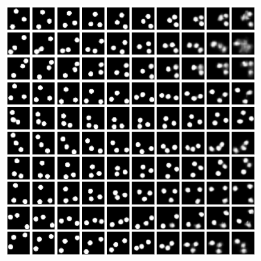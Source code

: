 \begin{frame}
\begin{figure}[h!]
\begin{minipage}{0.33\textwidth}
		\includegraphics[scale=0.19]{Bilder/bouncingBalls_ODE}
	\end{minipage}
\end{figure}
\end{frame}








